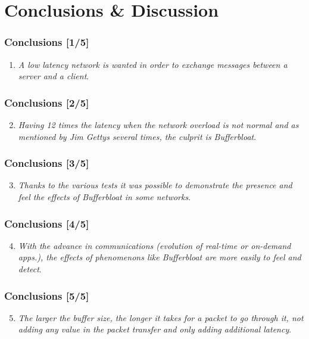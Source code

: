 \section{Conclusions \& Discussion}
\begin{frame}
	\frametitle{Conclusions \tiny{[1/5]}}
	\begin{block}{}
	\begin{enumerate}
		\item \textit{A low latency network is wanted in order to exchange messages between a server and a client}.
	\end{enumerate}
\end{block}
\end{frame}
\begin{frame}
	\frametitle{Conclusions \tiny{[2/5]}}
	\begin{block}{}
	\begin{enumerate}
			\setcounter{enumi}{1}
		\item \textit{Having 12 times the latency when the network overload is not normal and as mentioned by Jim Gettys several times, the culprit is Bufferbloat}.
	\end{enumerate}
\end{block}
\end{frame}
\begin{frame}
	\frametitle{Conclusions \tiny{[3/5]}}
	\begin{block}{}
	\begin{enumerate}
			\setcounter{enumi}{2}
		\item \textit{Thanks to the various tests it was possible to demonstrate the presence and feel the effects of Bufferbloat in some networks}.
	\end{enumerate}
\end{block}
\end{frame}
\begin{frame}
	\frametitle{Conclusions \tiny{[4/5]}}
	\begin{block}{}
	\begin{enumerate}
			\setcounter{enumi}{3}
		\item \textit{With the advance in communications (evolution of real-time or on-demand apps.), the effects of phenomenons like Bufferbloat are more easily to feel and detect}.
	\end{enumerate}
\end{block}
\end{frame}
\begin{frame}
	\frametitle{Conclusions \tiny{[5/5]}}
	\begin{block}{}
	\begin{enumerate}
			\setcounter{enumi}{4}
		\item \textit{The larger the buffer size, the longer it takes for a packet to go through it, not adding any value in the packet transfer and only adding additional latency}.
	\end{enumerate}
\end{block}
\end{frame}

